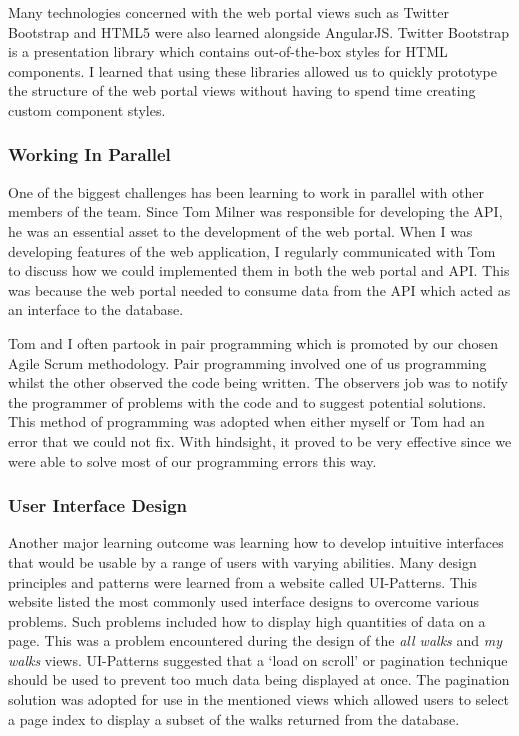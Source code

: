 \documentclass[11pt,a4paper]{report}
\begin{document}
Many technologies concerned with the web portal views such as Twitter Bootstrap and HTML5 were also learned alongside AngularJS. Twitter Bootstrap is a presentation library which contains out-of-the-box styles for HTML components. I learned that using these libraries allowed us to quickly prototype the structure of the web portal views without having to spend time creating custom component styles.

\subsubsection{Working In Parallel}
One of the biggest challenges has been learning to work in parallel with other members of the team. Since Tom Milner was responsible for developing the API, he was an essential asset to the development of the web portal. When I was developing features of the web application, I regularly communicated with Tom to discuss how we could implemented them in both the web portal and API. This was because the web portal needed to consume data from the API which acted as an interface to the database.

Tom and I often partook in pair programming which is promoted by our chosen Agile Scrum methodology. Pair programming involved one of us programming whilst the other observed the code being written. The observers job was to notify the programmer of problems with the code and to suggest potential solutions. This method of programming was adopted when either myself or Tom had an error that we could not fix. With hindsight, it proved to be very effective since we were able to solve most of our programming errors this way.

\subsubsection{User Interface Design}
Another major learning outcome was learning how to develop intuitive interfaces that would be usable by a range of users with varying abilities. Many design principles and patterns were learned from a website called UI-Patterns\cite{uipatterns}. This website listed the most commonly used interface designs to overcome various problems. Such problems included how to display high quantities of data on a page. This was a problem encountered during the design of the \emph{all walks} and \emph{my walks} views. UI-Patterns suggested that a `load on scroll' or pagination technique should be used to prevent too much data being displayed at once. The pagination solution was adopted for use in the mentioned views which allowed users to select a page index to display a subset of the walks returned from the database.
\end{document}
